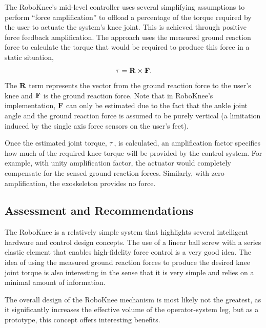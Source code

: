  The RoboKnee's mid-level controller uses several simplifying assumptions to perform ``force amplification'' to offload a percentage of the torque required by the user to actuate the system's knee joint.  This is achieved through positive force feedback amplification.  The approach uses the measured ground reaction force to calculate the torque that would be required to produce this force in a static situation, \[ {\bf \tau} = {\bf R} \times {\bf F}.\]  The ${\bf R}$ term represents the vector from the ground reaction force to the user's knee and ${\bf F}$ is the ground reaction force.  Note that in RoboKnee's implementation, ${\bf F}$ can only be estimated due to the fact that the ankle joint angle and the ground reaction force is assumed to be purely vertical (a limitation induced by the single axis force sensors on the user's feet).
   
   
 Once the estimated joint torque, ${\bf \tau}$, is calculated, an amplification factor specifies how much of the required knee torque will be provided by the control system.  For example, with unity amplification factor, the actuator would completely compensate for the sensed ground reaction forces.  Similarly, with zero amplification, the exoskeleton provides no force.
  
 
 \subsection{Assessment and Recommendations} 
 
 The RoboKnee is a relatively simple system that highlights several intelligent hardware and control design concepts.  The use of a linear ball screw with a series elastic element that enables high-fidelity force control is a very good idea. The idea of using the measured ground reaction forces to produce the desired knee joint torque is also interesting in the sense that it is very simple and relies on a minimal amount of information.
 
 The overall design of the RoboKnee mechanism is most likely not the greatest, as it significantly increases the effective volume of the operator-system leg, but as a prototype, this concept offers interesting benefits.
 
 
 
 
 
